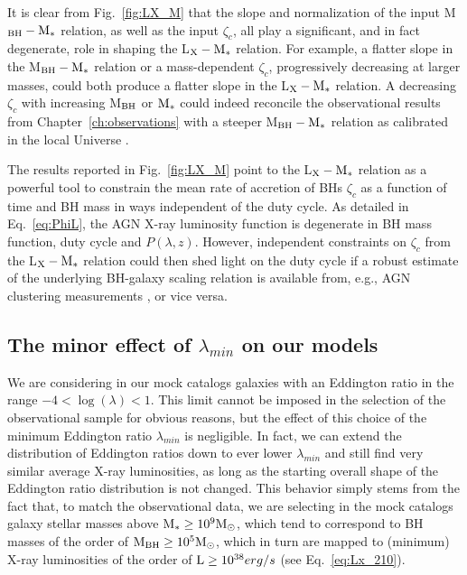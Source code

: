 It is clear from Fig.~\ref{fig:LX_M} that the slope and normalization of the input M$_{\rm BH}-{\rm M}_*$ relation, as well as the input $\zeta_c$, all play a significant, and in fact degenerate, role in shaping the L$_{\rm X}-{\rm M}_*$ relation. For example, a flatter slope in the M$_{\rm BH}-{\rm M}_*$ relation or a mass-dependent $\zeta_c$, progressively decreasing at larger masses, could both produce a flatter slope in the L$_{\rm X}-{\rm M}_*$ relation. A decreasing $\zeta_c$ with increasing M$_{\rm BH}$ or ${\rm M}_*$  could indeed reconcile the observational results from Chapter~\ref{ch:observations} with a steeper M$_{\rm BH}-{\rm M}_*$ relation as calibrated in the local Universe \citep[e.g.,][]{2016MNRAS.460.3119S,2018ApJ...869..113D}. 

The results reported in Fig.~\ref{fig:LX_M} point to the L$_{\rm X}-{\rm M}_*$ relation as a powerful tool to constrain the mean rate of accretion of BHs $\zeta_c$ as a function of time and BH mass in ways independent of the duty cycle. 
As detailed in Eq.~\ref{eq:PhiL}, the AGN X-ray luminosity function is degenerate in BH mass function, duty cycle and $P(\lambda,z)$. However, independent constraints on $\zeta_c$ from the L$_{\rm X}-{\rm M}_*$ relation could then shed light on the duty cycle if a robust estimate of the underlying BH-galaxy scaling relation is available from, e.g., AGN clustering measurements \citep[see discussion in][]{ShankarNat,Allevato21}, or vice versa.

\subsection{The minor effect of $\lambda_{min}$ on our models}
We are considering in our mock catalogs galaxies with an Eddington ratio in the range $-4<\log(\lambda)<1$. This limit cannot be imposed in the selection of the observational sample for obvious reasons, but the effect of this choice of the minimum Eddington ratio $\lambda_{min}$ is negligible. In fact, we can extend the distribution of Eddington ratios down to ever lower $\lambda_{min}$ and still find very similar average X-ray luminosities, as long as the starting overall shape of the Eddington ratio distribution is not changed. This behavior simply stems from the fact that, to match the observational data, we are selecting in the mock catalogs galaxy stellar masses above ${\rm M}_*\ge 10^9 {\rm M}_\odot$, which tend to correspond to BH masses of the order of ${\rm M}_{\rm BH}\ge10^5 {\rm M}_\odot$, which in turn are mapped to (minimum) X-ray luminosities of the order of ${\rm L}\ge10^{38}erg/s$ (see Eq.~\ref{eq:Lx_210}).

